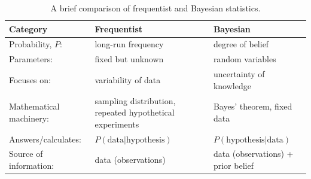 \begin{table}
\caption{A brief comparison of frequentist and Bayesian statistics.}
\centering
\label{tab:freq_bay}
\small
\bgroup
\def\arraystretch{1.2}
    \begin{tabular}{m{} | m{} | m{}}
    \toprule
    Category & Frequentist  & Bayesian \\ 
    \midrule
    \rowcolor{lightgrey} Probability, $P$: & long-run frequency  &  degree of belief \\
    Parameters: & fixed but unknown &  random variables \\
    \rowcolor{lightgrey} Focuses on: & variability of data  &   uncertainty of knowledge \\
    Mathematical \newline machinery: & sampling distribution, repeated hypothetical experiments & Bayes' theorem, fixed data\\
    \rowcolor{lightgrey} Answers/calculates: & $P\left(\mathrm{data}|\mathrm{hypothesis}\right)$ &  $P\left(\mathrm{hypothesis}|\mathrm{data}\right)$ \\
    Source of information: & data (observations) &   data (observations) + prior belief \\
    \bottomrule
    \end{tabular}
\egroup
\end{table}






